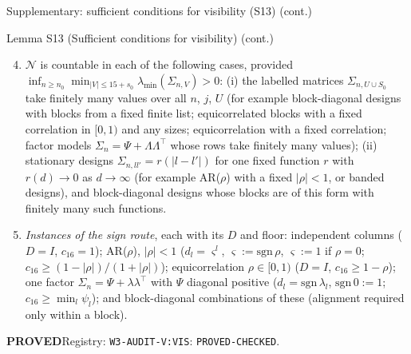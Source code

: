 \documentclass[aspectratio=169]{beamer}
\newcommand{\abs}[1]{\lvert #1\rvert}
\newcommand{\lmin}{\lambda_{\min}}
\newcommand{\Sz}{S_0}
\newcommand{\sz}{s_0}
\newcommand{\Sig}{\Sigma_n}
\newcommand{\rid}[1]{\texttt{#1}}
\begin{document}
\begin{frame}{Supplementary: sufficient conditions for visibility (S13) (cont.)}
\footnotesize
\begin{block}{Lemma S13 (Sufficient conditions for visibility) (cont.)}
\begin{enumerate}[(1)]\setcounter{enumi}{3}
  \item $\mathcal N$ is countable in each of the following cases, provided $\inf_{n\ge n_0}\min_{\abs{V}\le15+\sz}\lmin(\Sigma_{n,V})>0$:
    (i) the labelled matrices $\Sigma_{n,U\cup\Sz}$ take finitely many values over all $n$, $j$, $U$ (for example
    block-diagonal designs with blocks from a fixed finite list; equicorrelated blocks with a fixed correlation in $[0,1)$
    and any sizes; equicorrelation with a fixed correlation; factor models $\Sig=\Psi+\Lambda\Lambda^\top$ whose rows take
    finitely many values); (ii) stationary designs $\Sigma_{n,ll'}=r(\abs{l-l'})$ for one fixed function $r$ with
    $r(d)\to0$ as $d\to\infty$ (for example AR($\rho$) with a fixed $\abs\rho<1$, or banded designs), and block-diagonal
    designs whose blocks are of this form with finitely many such functions.
  \item \emph{Instances of the sign route}, each with its $D$ and floor: independent columns ($D=I$, $c_{16}=1$); AR($\rho$),
    $\abs\rho<1$ ($d_l=\varsigma^l$, $\varsigma:=\mathrm{sgn}\,\rho$, $\varsigma:=1$ if $\rho=0$; $c_{16}\ge(1-\abs\rho)/(1+\abs\rho)$);
    equicorrelation $\rho\in[0,1)$ ($D=I$, $c_{16}\ge1-\rho$); one factor $\Sig=\Psi+\lambda\lambda^\top$ with $\Psi$ diagonal
    positive ($d_l=\mathrm{sgn}\,\lambda_l$, $\mathrm{sgn}\,0:=1$; $c_{16}\ge\min_l\psi_l$); and block-diagonal combinations of
    these (alignment required only within a block).
\end{enumerate}
\end{block}
{\footnotesize \textbf{PROVED}\quad Registry: \rid{W3-AUDIT-V:VIS}: \rid{PROVED-CHECKED}.}

\end{frame}
\end{document}
